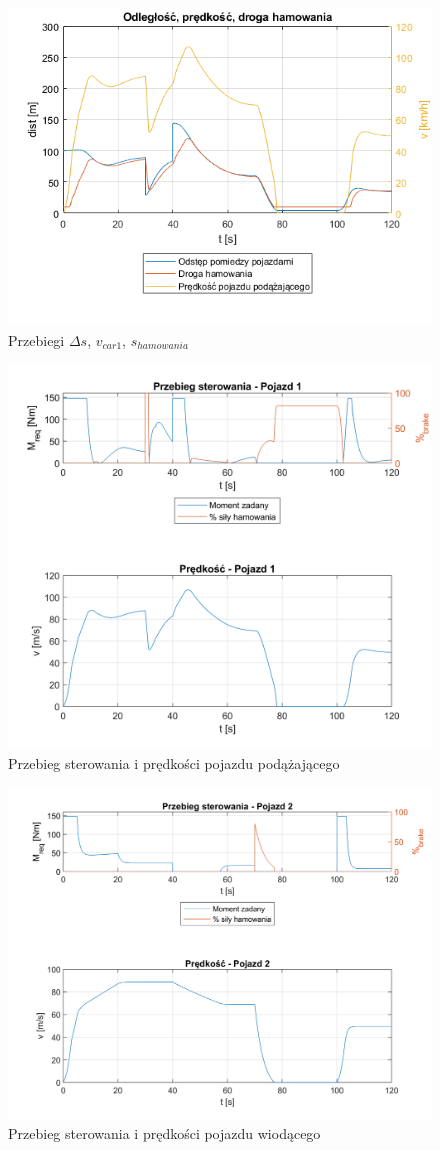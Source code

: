 \documentclass[12pt, a4paper, headings=normal]{article}
\begin{document}
\begin{figure}[H]
	\centering
	\includegraphics[width=.8\textwidth]{svbs.png}
	\caption{Przebiegi $\Delta s$, $v_{car1}$, $s_{hamowania}$}
	\label{fig:svbs}
\end{figure}

\begin{figure}[H]
	\centering
	\includegraphics[width=.8\textwidth]{str_c1.png}
	\caption{Przebieg sterowania i prędkości pojazdu podążającego}
	\label{fig:strc1}
\end{figure}

\begin{figure}[H]
	\centering
	\includegraphics[width=.8\textwidth]{str_c2.png}
	\caption{Przebieg sterowania i prędkości pojazdu wiodącego}
	\label{fig:strc2}
\end{figure}
\end{document}
